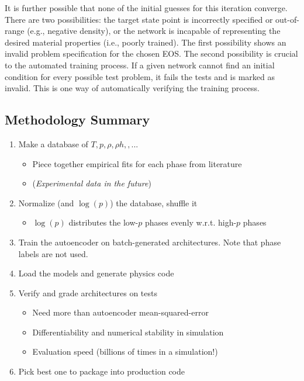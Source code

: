 \documentclass[AMA,STIX1COL]{WileyNJD-v2}
\begin{document}
It is further possible that none of the initial guesses for this iteration
converge. There are two possibilities: the target state point is
incorrectly specified or out-of-range (e.g., negative density), or the
network is incapable of representing the desired material properties
(i.e., poorly trained). The first possibility shows an invalid
problem specification for the chosen EOS. The second possibility is
crucial to the automated training process. If a given network cannot
find an initial condition for every possible test problem, it fails
the tests and is marked as invalid. This is one way of automatically
verifying the training process.


\hypertarget{header-n3493}{%
\subsection{Methodology Summary}\label{header-n3493}}

\begin{enumerate}
\def\labelenumi{\arabic{enumi}.}
\item
  Make a database of \(T,p,\rho,\rho h, ,...\)
  \begin{itemize}
  \item
    Piece together empirical fits for each phase from literature
  \item
    (\emph{Experimental data in the future})
  \end{itemize}
\item
  Normalize (and \(\log(p)\)) the database, shuffle it

  \begin{itemize}
  \item
    \(\log(p)\) distributes the low-\(p\) phases evenly w.r.t.
    high-\(p\) phases
  \end{itemize}
\item
  Train the autoencoder on batch-generated architectures. Note that
  phase labels are not used.
\item
  Load the models and generate physics code
\item
  Verify and grade architectures on tests

  \begin{itemize}
  \item
    Need more than autoencoder mean-squared-error
  \item
    Differentiability and numerical stability in simulation
  \item
    Evaluation speed (billions of times in a simulation!)
  \end{itemize}
\item
  Pick best one to package into production code
\end{enumerate}
\end{document}

